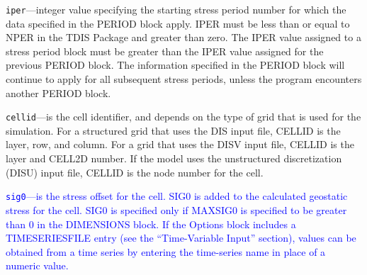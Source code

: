 \begin{description}
\item \texttt{iper}---integer value specifying the starting stress period number for which the data specified in the PERIOD block apply.  IPER must be less than or equal to NPER in the TDIS Package and greater than zero.  The IPER value assigned to a stress period block must be greater than the IPER value assigned for the previous PERIOD block.  The information specified in the PERIOD block will continue to apply for all subsequent stress periods, unless the program encounters another PERIOD block.

\item \texttt{cellid}---is the cell identifier, and depends on the type of grid that is used for the simulation.  For a structured grid that uses the DIS input file, CELLID is the layer, row, and column.   For a grid that uses the DISV input file, CELLID is the layer and CELL2D number.  If the model uses the unstructured discretization (DISU) input file, CELLID is the node number for the cell.

\item \textcolor{blue}{\texttt{sig0}---is the stress offset for the cell. SIG0 is added to the calculated geostatic stress for the cell. SIG0 is specified only if MAXSIG0 is specified to be greater than 0 in the DIMENSIONS block. If the Options block includes a TIMESERIESFILE entry (see the ``Time-Variable Input'' section), values can be obtained from a time series by entering the time-series name in place of a numeric value.}

\end{description}

